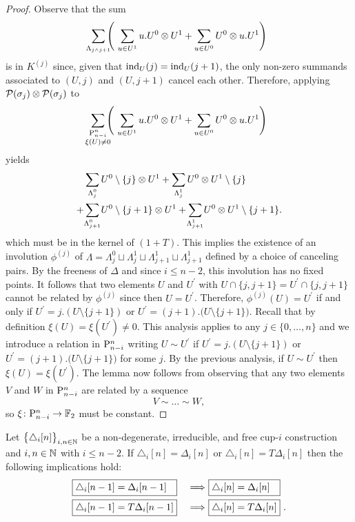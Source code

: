 \begin{proof}
	Observe that the sum
	\[
	\sum_{\mathclap{\Lambda_{j \wedge j+1}}}
	\left(\
	\sum_{u \in U^1} {u.U^0} \ot {U^1} +
	\sum_{u \in U^0} {U^0} \ot {u.U^1}
	\right)
	\]
	is in $K^{(j)}$ since, given that $\ind_U(j) = \ind_U(j+1)$, the only non-zero summands associated to $(U,j)$ and $(U,j+1)$ cancel each other.
	Therefore, applying $\cP(\sigma_j) \ot \cP(\sigma_j)$ to
	\[
	\sum_{\mathclap{\substack{\P_{n-i}^n \\ \xi(U) \neq 0}}}
	\left(\
	\sum_{u \in U^1} {u.U^0} \ot {U^1} +
	\sum_{u \in U^0} {U^0} \ot {u.U^1}
	\right)
	\]
	yields
	\begin{align*}
	&\sum_{\mathclap{\Lambda_{j}^0}} U^0 \setminus \{j\} \ot {U^1}	+
	\sum_{\mathclap{\Lambda_{j}^1}} U^0 \ot {U^1} \setminus \{j\} \\ +
	&\sum_{\mathclap{\Lambda_{j+1}^0}} U^0 \setminus \{j+1\} \ot {U^1} +
	\sum_{\mathclap{\Lambda_{j+1}^1}} U^0 \ot {U^1} \setminus \{j+1\}.
	\end{align*}
	which must be in the kernel of $(1+T)$.
	This implies the existence of an involution $\phi^{(j)}$ of $\Lambda = \Lambda^0_{j} \sqcup \Lambda^1_{j} \sqcup \Lambda^1_{j+1} \sqcup \Lambda^1_{j+1}$ defined by a choice of canceling pairs.
	By the freeness of $\Delta$ and since $i \leq n-2$, this involution has no fixed points.
	It follows that two elements $U$ and $U^\prime$ with $U \cap \{j, j+1\} = U^\prime \cap \{j, j+1\}$ cannot be related by $\phi^{(j)}$ since then $U = U^\prime$.
	Therefore, $\phi^{(j)}(U) = U^\prime$ if and only if $U^\prime = j.(U \setminus \{j+1\})$ or $U^\prime = (j+1).\big( U \setminus \{j+1\} \big)$.
	Recall that by definition $\xi(U) = \xi(U^\prime) \neq 0$.
	This analysis applies to any $j \in \{0, \dots, n\}$ and we introduce a relation in $\P_{n-i}^n$ writing $U \sim U^\prime$ if $U^\prime = j.(U \setminus \{j+1\})$ or $U^\prime = (j+1).\big( U \setminus \{j+1\} \big)$ for some $j$.
	By the previous analysis, if $U \sim U^\prime$ then $\xi(U) = \xi(U^\prime)$.
	The lemma now follows from observing that any two elements $V$ and $W$ in $\P_{n-i}^n$ are related by a sequence
	\[
	V \sim \dots \sim W,
	\]
	so $\xi \colon \P_{n-i}^n \to \F$ must be constant.
\end{proof}

\begin{lemma} \label{l:second nail}
	Let $\big\{ \triangle_i [n] \big\}_{i,n\in\N}$ be a non-degenerate, irreducible, and free \mbox{cup-$i$} construction and $i,n \in \N$ with $i \leq n-2$.
	If $\triangle_i [n] = \Delta_i [n]$ or $\triangle_i [n] = T \Delta_i [n]$ then the following implications hold:
	\begin{alignat*}{2}
	&\boxed{\triangle_i [n-1] = \Delta_i [n-1] \kern 7.3pt}\ &\Longrightarrow\
	&\boxed{\triangle_i [n] = \Delta_i [n] \kern 7.3pt} \\
	&\boxed{\triangle_i [n-1] = T \Delta_i [n-1]}\ &\Longrightarrow\
	&\boxed{\triangle_i [n] = T \Delta_i [n]} \ .
	\end{alignat*}
\end{lemma}

